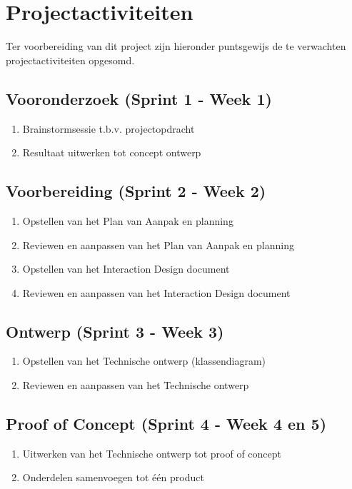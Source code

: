 \chapter{Projectactiviteiten} \label{cha:projectactiviteiten}
Ter voorbereiding van dit project zijn hieronder puntsgewijs de te verwachten projectactiviteiten opgesomd.
\section{Vooronderzoek (Sprint 1 - Week 1)} \label{sec:vooronderzoek}
\begin{enumerate}
  \item Brainstormsessie t.b.v. projectopdracht
  \item Resultaat uitwerken tot concept ontwerp
\end{enumerate}
\section{Voorbereiding (Sprint 2 - Week 2)} \label{sec:voorbereiding}
\begin{enumerate}
  \item Opstellen van het Plan van Aanpak en planning
  \item Reviewen en aanpassen van het Plan van Aanpak en planning
  \item Opstellen van het Interaction Design document
  \item Reviewen en aanpassen van het Interaction Design document
\end{enumerate}
\section{Ontwerp (Sprint 3 - Week 3)} \label{sec:ontwerp}
\begin{enumerate}
  \item Opstellen van het Technische ontwerp (klassendiagram)
  \item Reviewen en aanpassen van het Technische ontwerp
\end{enumerate}
\section{Proof of Concept (Sprint 4 - Week 4 en 5)} \label{sec:proofofconcept}
\begin{enumerate}
  \item Uitwerken van het Technische ontwerp tot proof of concept
  \item Onderdelen samenvoegen tot één product
\end{enumerate}

